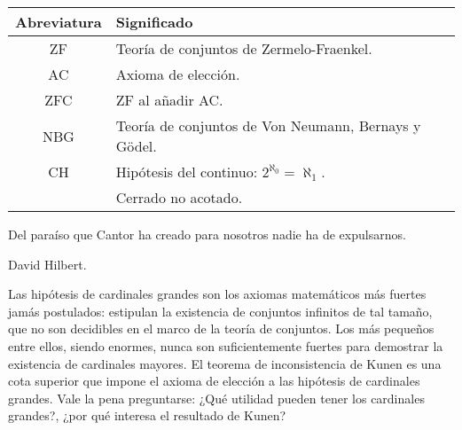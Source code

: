\newpage
{}

\begin{center}
    \begin{tabular}{cl}
        Abreviatura & Significado \\
        \hline\noalign{\smallskip}
        ZF & Teoría de conjuntos de Zermelo-Fraenkel.\\
        AC & Axioma de elección.\\
        ZFC & ZF al añadir AC.\\
        NBG & Teoría de conjuntos de Von Neumann, Bernays y Gödel.\\
        CH & Hipótesis del continuo: $2^{\aleph_0} = \aleph_1$. \\
        \cna{} & Cerrado no acotado. \\
    \end{tabular}
\end{center}
\fi
\iftoc \ToC \fi
\mainmatter
\ifintro
{}
\thispagestyle{empty}

\epigraph
{
Del paraíso que Cantor ha creado para nosotros nadie ha de expulsarnos.
}
{David Hilbert. \autocite[170]{hilbert_uber_1926}}

Las hipótesis de cardinales grandes son los axiomas matemáticos
más fuertes jamás postulados: estipulan la existencia de conjuntos
infinitos de tal tamaño, que no son decidibles en el marco de la teoría de conjuntos.
Los más pequeños entre ellos, siendo enormes, nunca son suficientemente
fuertes para demostrar la existencia de cardinales mayores.
El teorema de inconsistencia de Kunen es
una cota superior que impone el axioma de elección a las
hipótesis de cardinales grandes.
Vale la pena preguntarse: ¿Qué utilidad pueden tener los cardinales grandes?,
¿por qué interesa el resultado de Kunen?

